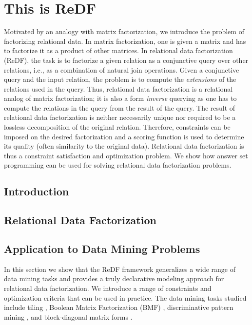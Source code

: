 \chapter{This is ReDF}\label{ch:ReDF}
\newcommand{\redfpath}{chapters/ReDF/tex_files}


Motivated by an analogy with matrix factorization, we introduce the problem of factorizing relational data. In matrix factorization, one is given a matrix and has to factorize it as a product of other matrices. In relational data factorization (ReDF), the task is to factorize a given relation as a conjunctive query over other relations, i.e., as a combination of natural join operations. Given a conjunctive query and the input relation, the problem is to compute the \emph{extensions} of the relations used in the query. Thus, relational data factorization is a relational analog of matrix factorization; it is also a form {\em inverse} querying as one has to compute the relations in the query from the result of the query.  The result of relational data factorization is neither necessarily unique nor required to be a lossless decomposition of the original relation. Therefore, constraints can be imposed on the desired factorization and a scoring function is used to determine its quality (often similarity to the original data). Relational data factorization is thus a constraint satisfaction and optimization problem. We show how answer set programming can be used for solving relational data factorization problems. 


\section{Introduction}
 
\section{Relational Data Factorization}
\label{section:framework}


\section{Application to Data Mining Problems}
\label{section:dm_problems}

In this section we show that the ReDF framework generalizes a wide range of data mining tasks and provides a truly declarative modeling approach for relational data factorization. We introduce a range of constraints and optimization criteria that can be used in practice. The data mining tasks studied include tiling \citep{tiling},  Boolean Matrix Factorization (BMF) \citep{dbp}, discriminative pattern mining \citep{DBLP:conf/pkdd/KnobbeH06}, and block-diagonal matrix forms \citep{blockdiagonal}.%

